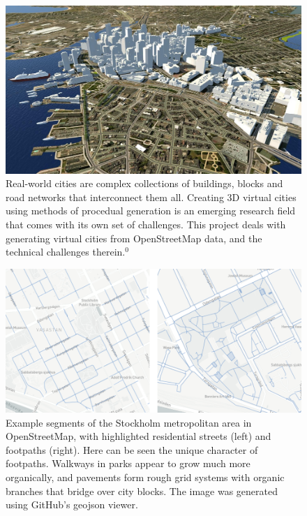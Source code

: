 \documentclass{kththesis}
\begin{document}
\begin{figure}[H]
    \centering
    \includegraphics[width=\textwidth,height=0.5\textheight,keepaspectratio]{img_virtual_city}
    \caption{Real-world cities are complex collections of buildings, blocks and road networks that interconnect them all. Creating 3D virtual cities using methods of procedual generation is an emerging research field that comes with its own set of challenges. This project deals with generating virtual cities from OpenStreetMap data, and the technical challenges therein.$^0$}
    \label{fig:virtual-city}
\end{figure}


\begin{figure}[H]
    \centering
    \includegraphics[width=\textwidth,height=0.5\textheight,keepaspectratio]{img_map_residential_footpath_compare}
    \caption{Example segments of the Stockholm metropolitan area in OpenStreetMap, with highlighted residential streets (left) and footpaths (right). Here can be seen the unique character of footpaths. Walkways in parks appear to grow much more organically, and pavements form rough grid systems with organic branches that bridge over city blocks. The image was generated using GitHub's geojson viewer.}
    \label{fig:residential-footpath-map}
\end{figure}
\end{document}
